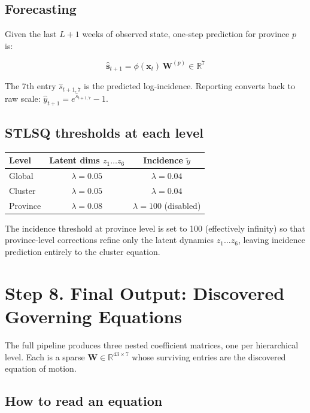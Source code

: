 \documentclass{article}
\begin{document}
\subsection*{Forecasting}

Given the last $L+1$ weeks of observed state, one-step prediction for province $p$ is:

\begin{equation}
    \hat{\mathbf{s}}_{t+1} = \phi(\mathbf{x}_t)\,\mathbf{W}^{(p)} \in \mathbb{R}^7
\end{equation}

The 7th entry $\hat{s}_{t+1,7}$ is the predicted log-incidence.
Reporting converts back to raw scale: $\hat{y}_{t+1} = e^{\hat{s}_{t+1,7}} - 1$.

\subsection*{STLSQ thresholds at each level}

\begin{center}
\begin{tabular}{lcc}
\toprule
Level & Latent dims $z_1\ldots z_6$ & Incidence $\tilde{y}$ \\
\midrule
Global   & $\lambda = 0.05$ & $\lambda = 0.04$ \\
Cluster  & $\lambda = 0.05$ & $\lambda = 0.04$ \\
Province & $\lambda = 0.08$ & $\lambda = 100$ (disabled) \\
\bottomrule
\end{tabular}
\end{center}

The incidence threshold at province level is set to 100 (effectively infinity) so that
province-level corrections refine only the latent dynamics $z_1\ldots z_6$,
leaving incidence prediction entirely to the cluster equation.

\section*{Step 8. Final Output: Discovered Governing Equations}

The full pipeline produces three nested coefficient matrices,
one per hierarchical level. Each is a sparse $\mathbf{W} \in \mathbb{R}^{43 \times 7}$
whose surviving entries are the discovered equation of motion.

\subsection*{How to read an equation}
\end{document}
